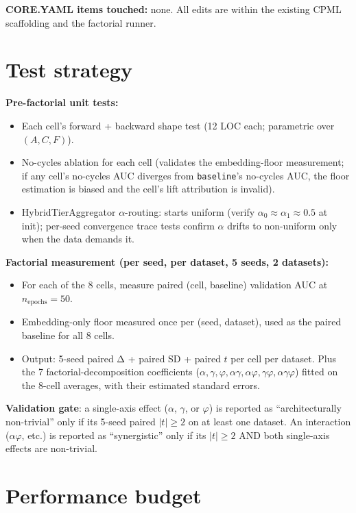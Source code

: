 \documentclass[11pt]{article}
\begin{document}
\textbf{CORE.YAML items touched:} none. All edits are within the
existing CPML scaffolding and the factorial runner.

\section{Test strategy}

\textbf{Pre-factorial unit tests:}
\begin{itemize}
  \item Each cell's forward + backward shape test (12 LOC each;
    parametric over $(A, C, F)$).
  \item No-cycles ablation for each cell (validates the
    embedding-floor measurement; if any cell's no-cycles AUC
    diverges from \texttt{baseline}'s no-cycles AUC, the floor
    estimation is biased and the cell's lift attribution is
    invalid).
  \item HybridTierAggregator $\alpha$-routing: starts uniform
    (verify $\alpha_0 \approx \alpha_1 \approx 0.5$ at init); per-seed
    convergence trace tests confirm $\alpha$ drifts to non-uniform
    only when the data demands it.
\end{itemize}

\textbf{Factorial measurement (per seed, per dataset, 5 seeds, 2 datasets):}
\begin{itemize}
  \item For each of the 8 cells, measure paired (cell, baseline)
    validation AUC at $n_{\text{epochs}} = 50$.
  \item Embedding-only floor measured once per (seed, dataset), used
    as the paired baseline for all 8 cells.
  \item Output: 5-seed paired Δ + paired SD + paired $t$ per cell
    per dataset. Plus the 7 factorial-decomposition coefficients
    ($\alpha, \gamma, \varphi, \alpha\gamma, \alpha\varphi, \gamma\varphi, \alpha\gamma\varphi$)
    fitted on the 8-cell averages, with their estimated standard
    errors.
\end{itemize}

\textbf{Validation gate}: a single-axis effect ($\alpha$, $\gamma$, or
$\varphi$) is reported as ``architecturally non-trivial'' only if
its 5-seed paired $|t| \ge 2$ on at least one dataset. An interaction
($\alpha\varphi$, etc.) is reported as ``synergistic'' only if its
$|t| \ge 2$ AND both single-axis effects are non-trivial.

\section{Performance budget}
\end{document}

